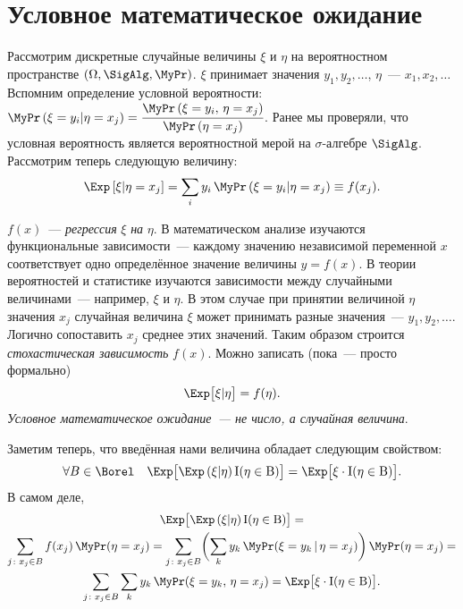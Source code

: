 \section{Условное математическое ожидание}
    Рассмотрим дискретные случайные величины $\xi$ и $\eta$ на вероятностном пространстве $(\Omega, \SigAlg, \MyPr)$. 
    $\xi$ принимает значения $y_1, y_2, \ldots$, $\eta$~--- $x_1, x_2, \ldots$
    Вспомним определение условной вероятности: ${\MyPr\left( \xi = y_i | \eta = x_j \right) = \cfrac{\MyPr\left( \xi = y_i, \, \eta = x_j\right)}{\MyPr\left(\eta = x_j\right)}}$.
    Ранее мы проверяли, что условная вероятность является вероятностной мерой на $\sigma$-алгебре $\SigAlg$.
    Рассмотрим теперь следующую величину:
    \begin{equation}
        \Exp \left[ \xi | \eta = x_j \right] = 
        \sum\limits_i y_i \, \MyPr\left(\xi = y_i | \eta = x_j \right) \equiv
        f(x_j).
        \label{cond_exp:discrete}
    \end{equation}
    
    $f(x)$~--- \textit{регрессия} $\xi$ \textit{на} $\eta$. 
    В математическом анализе изучаются функциональные зависимости~--- каждому значению независимой переменной $x$ соответствует одно определённое значение величины $y = f(x)$.
    В теории вероятностей и статистике изучаются зависимости между случайными величинами~--- например, $\xi$ и $\eta$.
    В этом случае при принятии величиной $\eta$ значения $x_j$ случайная величина $\xi$ может принимать разные значения~--- $y_1, y_2, \ldots$.
    Логично сопоставить $x_j$ среднее этих значений.
    Таким образом строится \textit{стохастическая зависимость} $f(x)$.
    Можно записать (пока~--- просто формально)
    \begin{equation*}
        \Exp \bigl[\xi | \eta \bigr] = f(\eta).
    \end{equation*}
    \textit{Условное математическое ожидание~--- не число, а случайная величина}.
    
    Заметим теперь, что введённая нами величина обладает следующим свойством:
    \begin{equation*}
        \forall B \in \Borel \quad \Exp \bigl[ \Exp \left( \xi | \eta\right) \rm{I}(\eta \in B)\bigr] = 
        \Exp \bigl[ \xi \cdot \rm{I}(\eta \in B) \bigr].
    \end{equation*}
    В самом деле,
    \begin{gather*}
        \Exp \bigl[ \Exp \left( \xi | \eta\right) \rm{I}(\eta \in B)\bigr] = \\
        \sum\limits_{j \colon x_j \in B} f(x_j) \, \MyPr(\eta = x_j) = 
        \sum\limits_{j \colon x_j \in B} \biggl( \sum\limits_k y_k \, \MyPr(\xi = y_k \,|\, \eta = x_j) \biggr) \, \MyPr(\eta = x_j) = \\
        \sum\limits_{j \colon x_j \in B} \sum\limits_k y_k \, \MyPr(\xi = y_k, \, \eta = x_j) = 
        \Exp \bigl[ \xi \cdot \rm{I}(\eta \in B)\bigr].
    \end{gather*}

